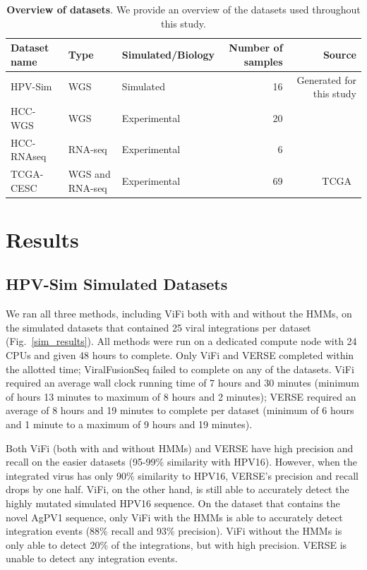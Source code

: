 \documentclass{bioinfo}
\begin{document}
\begin{table}[htb]
\centering
\caption{\textbf{Overview of datasets}.  We provide an overview of the datasets used throughout this study.  }
\label{table:data}
\begin{tabular}{|l|l|l|r|r|}
\hline
Dataset name & Type & Simulated/Biology & Number of samples & Source \\ \hline
HPV-Sim & WGS &Simulated& 16 & Generated for this study \\ \hline
HCC-WGS & WGS & Experimental&20 & ~\cite{Sung2012} \\ \hline
HCC-RNAseq & RNA-seq & Experimental&6 & ~\cite{Lau2014} \\ \hline
TCGA-CESC & WGS and RNA-seq &Experimental& 69 & TCGA~\cite{TODO} \\ \hline 
\end{tabular}
\end{table}
\section{Results}

\subsection{HPV-Sim Simulated Datasets}
We ran all three methods, including ViFi both with and without the HMMs, on the simulated datasets that contained 25 viral integrations per dataset (Fig.~\ref{sim_results}).  All methods were run on a dedicated compute node with 24 CPUs and given 48 hours to complete.  Only ViFi and VERSE completed within the allotted time; ViralFusionSeq failed to complete on any of the datasets.  ViFi required an average wall clock running time of 7 hours and 30 minutes (minimum of hours 13 minutes to maximum of 8 hours and 2 minutes); VERSE required an average of 8 hours and 19 minutes to complete per dataset (minimum of 6 hours and 1 minute to a maximum of 9 hours and 19 minutes).  

Both ViFi (both with and without HMMs) and VERSE have high precision and recall on the easier datasets (95-99\% similarity with HPV16).  However, when the integrated virus has only 90\% similarity to HPV16, VERSE's precision and recall drops by one half.  ViFi, on the other hand, is still able to accurately detect the highly mutated simulated HPV16 sequence.  On the dataset that contains the novel AgPV1 sequence, only ViFi with the HMMs is able to accurately detect integration events (88\% recall and 93\% precision).  ViFi without the HMMs is only able to detect 20\% of the integrations, but with high precision.  VERSE is unable to detect any integration events.  
\end{document}
